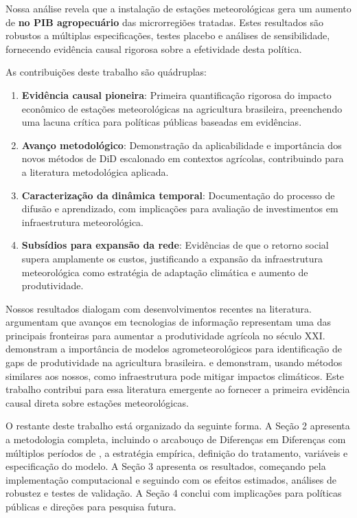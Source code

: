 \documentclass[
	12pt,				%
	oneside,			%
	a4paper,			%
	english,			%
	french,				%
	spanish,			%
	brazil				%
	]{abntex2}
\begin{document}
Nossa análise revela que a instalação de estações meteorológicas gera um aumento de \textbf{\mainattpct{} no PIB agropecuário} das microrregiões tratadas. Estes resultados são robustos a múltiplas especificações, testes placebo e análises de sensibilidade, fornecendo evidência causal rigorosa sobre a efetividade desta política.

As contribuições deste trabalho são quádruplas:

\begin{enumerate}
\item \textbf{Evidência causal pioneira}: Primeira quantificação rigorosa do impacto econômico de estações meteorológicas na agricultura brasileira, preenchendo uma lacuna crítica para políticas públicas baseadas em evidências.

\item \textbf{Avanço metodológico}: Demonstração da aplicabilidade e importância dos novos métodos de DiD escalonado em contextos agrícolas, contribuindo para a literatura metodológica aplicada.

\item \textbf{Caracterização da dinâmica temporal}: Documentação do processo de difusão e aprendizado, com implicações para avaliação de investimentos em infraestrutura meteorológica.

\item \textbf{Subsídios para expansão da rede}: Evidências de que o retorno social supera amplamente os custos, justificando a expansão da infraestrutura meteorológica como estratégia de adaptação climática e aumento de produtividade.
\end{enumerate}

Nossos resultados dialogam com desenvolvimentos recentes na literatura.  argumentam que avanços em tecnologias de informação representam uma das principais fronteiras para aumentar a produtividade agrícola no século XXI.  demonstram a importância de modelos agrometeorológicos para identificação de gaps de produtividade na agricultura brasileira.  e  demonstram, usando métodos similares aos nossos, como infraestrutura pode mitigar impactos climáticos. Este trabalho contribui para essa literatura emergente ao fornecer a primeira evidência causal direta sobre estações meteorológicas.

O restante deste trabalho está organizado da seguinte forma. A Seção 2 apresenta a metodologia completa, incluindo o arcabouço de Diferenças em Diferenças com múltiplos períodos de , a estratégia empírica, definição do tratamento, variáveis e especificação do modelo. A Seção 3 apresenta os resultados, começando pela implementação computacional e seguindo com os efeitos estimados, análises de robustez e testes de validação. A Seção 4 conclui com implicações para políticas públicas e direções para pesquisa futura.
\end{document}
